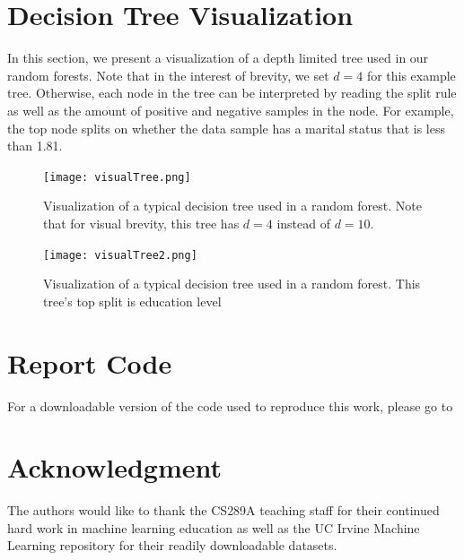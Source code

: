 \documentclass[conference]{IEEEtran}
\begin{document}
\appendices
\section{Decision Tree Visualization}
In this section, we present a visualization of a depth limited tree used in our random forests. Note that in the interest of brevity, we set $d=4$ for this example tree. Otherwise, each node in the tree can be interpreted by reading the split rule as well as the amount of positive and negative samples in the node. For example, the top node splits on whether the data sample has a marital status that is less than 1.81.
\begin{figure}[h!]
\centering
\texttt{[image: visualTree.png]}
\caption{Visualization of a typical decision tree used in a random forest. Note that for visual brevity, this tree has $d=4$ instead of $d=10$.}
\label{fig:visualTree}
\end{figure}
\begin{figure}[h!]
\centering
\texttt{[image: visualTree2.png]}
\caption{Visualization of a typical decision tree used in a random forest. This tree's top split is education level}
\label{fig:visualTree2}
\end{figure}

\section{Report Code}
For a downloadable version of the code used to reproduce this work, please go to 

\section*{Acknowledgment}
The authors would like to thank the CS289A teaching staff for their continued hard work in machine learning education as well as the UC Irvine Machine Learning repository for their readily downloadable datasets.

\ifCLASSOPTIONcaptionsoff
  \newpage
\fi

\end{document}
